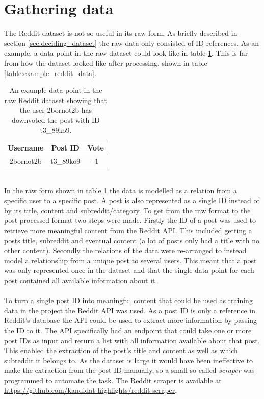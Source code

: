 \section{Gathering data}\label{sec:gathering_data}
The Reddit dataset is not so useful in its raw form. As briefly described in section \ref{sec:deciding_dataset} the raw data only consisted of ID references. As an example, a data point in the raw dataset could look like in table \ref{table:raw_reddit_data}. This is far from how the dataset looked like after processing, shown in table \ref{table:example_reddit_data}.
\begin{table}[h!]
    \centering
    \begin{tabular}{ c c c } 
        \hline
        \textbf{Username} & \textbf{Post ID} & \textbf{Vote} \\
        \hline
        \hline
        2bornot2b & t3\_89ko9 &-1\\
        \hline
    \end{tabular}
    \caption{An example data point in the raw Reddit dataset showing that the user 2bornot2b has downvoted the post with ID t3\_89ko9.}
    \label{table:raw_reddit_data}
\end{table}
\\
In the raw form shown in table \ref{table:raw_reddit_data} the data is modelled as a relation from a specific user to a specific post. A post is also represented as a single ID instead of by its title, content and subreddit/category. To get from the raw format to the post-processed format two steps were made. Firstly the ID of a post was used to retrieve more meaningful content from the Reddit API. This included getting a posts title, subreddit and eventual content (a lot of posts only had a title with no other content). Secondly the relations of the data were re-arranged to instead model a relationship from a unique post to several users. This meant that a post was only represented once in the dataset and that the single data point for each post contained all available information about it.
\\\\
To turn a single post ID into meaningful content that could be used as training data in the project the Reddit API was used. As a post ID is only a reference in Reddit's database the API could be used to extract more information by passing the ID to it. The API specifically had an endpoint that could take one or more post IDs as input and return a list with all information available about that post. This enabled the extraction of the post's title and content as well as which subreddit it belongs to. As the dataset is large it would have been ineffective to make the extraction from the post ID manually, so a small so called \textit{scraper} was programmed to automate the task. The Reddit scraper is available at \url{https://github.com/kandidat-highlights/reddit-scraper}.
